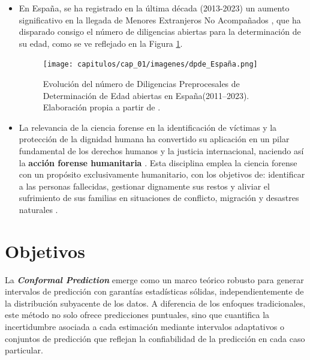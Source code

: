 \begin{itemize}
    \item En España, se ha registrado en la última década (2013-2023) un aumento significativo en la llegada
    de Menores Extranjeros No Acompañados \cite{fge2024,fge2019,fge2016,fge2013}, que ha disparado 
    consigo el número de diligencias abiertas para la determinación de su edad, como se ve reflejado 
    en la Figura \ref{fig:evolucion_DPDE}.

    \begin{figure}[h]
        \centering
        \texttt{[image: capitulos/cap\_01/imagenes/dpde\_España.png]}
        \caption{Evolución del número de Diligencias Preprocesales de Determinación de Edad abiertas en España(2011–2023). 
                 Elaboración propia a partir de \cite{fge2013,fge2016,fge2019, fge2024}.} 
        \label{fig:evolucion_DPDE}
    \end{figure}

    \item La relevancia de la ciencia forense en la identificación de víctimas y la protección de la dignidad humana ha convertido 
    su aplicación en un pilar fundamental de los derechos humanos y la justicia internacional, naciendo así la  
    \textbf{acción forense humanitaria} \cite{cordner2017}. Esta disciplina emplea la ciencia forense con un propósito 
    exclusivamente humanitario, con los objetivos de: identificar a las personas fallecidas, gestionar dignamente sus restos y 
    aliviar el sufrimiento de sus familias en situaciones de conflicto, migración y desastres naturales \cite{tidballbinz2021}. 

\end{itemize}


\section{Objetivos}

La \textbf{\textit{Conformal Prediction}} emerge como un marco teórico robusto para generar intervalos de predicción con 
garantías estadísticas sólidas, independientemente de la distribución subyacente de los datos. A diferencia de los 
enfoques tradicionales, este método no solo ofrece predicciones puntuales, sino que cuantifica la incertidumbre asociada
a cada estimación mediante intervalos adaptativos o conjuntos de predicción que reflejan la confiabilidad de la 
predicción en cada caso particular.

